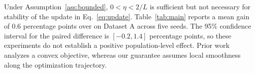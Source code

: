 Under Assumption~\ref{ass:bounded}, $0 < \eta < 2/L$ is sufficient but not necessary for stability of the update in Eq.~\eqref{eq:update}. Table~\ref{tab:main} reports a mean gain of 0.6 percentage points over \citet{lee2024baseline} on Dataset A across five seeds. The 95\% confidence interval for the paired difference is $[-0.2, 1.4]$ percentage points, so these experiments do not establish a positive population-level effect. Prior work analyzes a convex objective, whereas our guarantee assumes local smoothness along the optimization trajectory.
